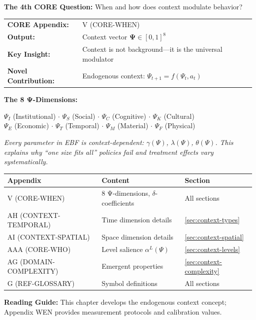 \begin{tcolorbox}[
    colback=green!5!white,
    colframe=green!75!black,
    title={\textbf{10C CORE Connection: WHEN (Question 4)}},
    fonttitle=\bfseries
]
\textbf{The 4th CORE Question:} When and how does context modulate behavior?

\medskip
\begin{tabular}{ll}
\textbf{CORE Appendix:} & V (CORE-WHEN) \\
\textbf{Output:} & Context vector $\boldsymbol{\Psi} \in [0,1]^8$ \\
\textbf{Key Insight:} & Context is not background---it is the universal modulator \\
\textbf{Novel Contribution:} & Endogenous context: $\Psi_{t+1} = f(\Psi_t, a_t)$
\end{tabular}

\medskip
\textbf{The 8 Ψ-Dimensions:}
\begin{center}
\small
$\Psi_I$ (Institutional) $\cdot$ $\Psi_S$ (Social) $\cdot$ $\Psi_C$ (Cognitive) $\cdot$ $\Psi_K$ (Cultural)\\
$\Psi_E$ (Economic) $\cdot$ $\Psi_T$ (Temporal) $\cdot$ $\Psi_M$ (Material) $\cdot$ $\Psi_F$ (Physical)
\end{center}

\textit{Every parameter in EBF is context-dependent: $\gamma(\Psi)$, $\lambda(\Psi)$, $\theta(\Psi)$. This explains why ``one size fits all'' policies fail and treatment effects vary systematically.}
\end{tcolorbox}

\begin{tcolorbox}[
    colback=yellow!10!white,
    colframe=orange!75!black,
    title={\textbf{Appendix References for This Chapter}},
    fonttitle=\bfseries
]
\begin{tabular}{lll}
\textbf{Appendix} & \textbf{Content} & \textbf{Section} \\
\midrule
V (CORE-WHEN) & 8 Ψ-dimensions, $\delta$-coefficients & All sections \\
AH (CONTEXT-TEMPORAL) & Time dimension details & \ref{sec:context-types} \\
AI (CONTEXT-SPATIAL) & Space dimension details & \ref{sec:context-spatial} \\
AAA (CORE-WHO) & Level salience $\alpha^L(\Psi)$ & \ref{sec:context-levels} \\
AG (DOMAIN-COMPLEXITY) & Emergent properties & \ref{sec:context-complexity} \\
G (REF-GLOSSARY) & Symbol definitions & All sections
\end{tabular}

\medskip
\textbf{Reading Guide:} This chapter develops the endogenous context concept;
Appendix WEN provides measurement protocols and calibration values.
\end{tcolorbox}

